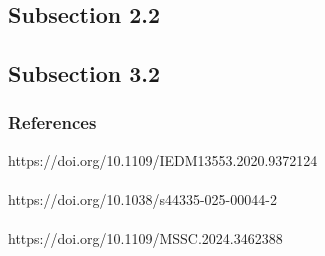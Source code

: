 \documentclass[xcolor={usenames,dvipsnames},hyperref={hyperindex,bookmarks}]{beamer}
\begin{document}
\subsection{Subsection 2.2}



%		


\subsection{Subsection 3.2}



%		


{\linespread{1}
\begin{frame}
	\frametitle{References}
	
	
	
	https://doi.org/10.1109/IEDM13553.2020.9372124 \\
	\ \\
	https://doi.org/10.1038/s44335-025-00044-2 \\
	\ \\
	https://doi.org/10.1109/MSSC.2024.3462388
\end{frame}
}




\end{document}
